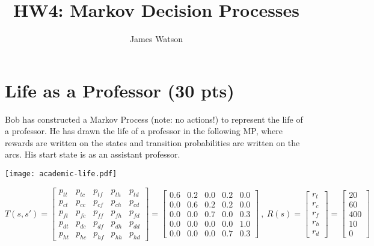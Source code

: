 \documentclass[fleqn]{hw4}
\title{HW4: Markov Decision Processes}
\institute{University of Utah}
\author{James Watson}
\begin{document}
\maketitle



\section{Life as a Professor (30 pts)}

Bob has constructed a Markov Process (note: no actions!) to represent the life of a professor.
He has drawn the life of a professor in the following MP, where rewards are written on the states
and transition probabilities are written on the arcs.  His start state is as an assistant professor.

\begin{centering}
\texttt{[image: academic-life.pdf]}  
\end{centering}


$$ T(s,s') = \begin{bmatrix}
	p_{tt} & p_{tc} & p_{tf} & p_{th} & p_{td} \\
	p_{ct} & p_{cc} & p_{cf} & p_{ch} & p_{cd} \\
	p_{ft} & p_{fc} & p_{ff} & p_{fh} & p_{fd} \\
	p_{dt} & p_{dc} & p_{df} & p_{dh} & p_{dd} \\
	p_{ht} & p_{hc} & p_{hf} & p_{hh} & p_{hd}
\end{bmatrix} = \begin{bmatrix}
	0.6 & 0.2 & 0.0 & 0.2 & 0.0 \\
	0.0 & 0.6 & 0.2 & 0.2 & 0.0 \\
	0.0 & 0.0 & 0.7 & 0.0 & 0.3 \\
	0.0 & 0.0 & 0.0 & 0.0 & 1.0 \\
	0.0 & 0.0 & 0.0 & 0.7 & 0.3 
\end{bmatrix} \ , \ R(s) = \begin{bmatrix}
r_{t} \\
r_{c} \\
r_{f} \\
r_{h} \\
r_{d} 
\end{bmatrix} = \begin{bmatrix}
20 \\
60 \\
400 \\
10 \\
0 
\end{bmatrix} $$
\end{document}
